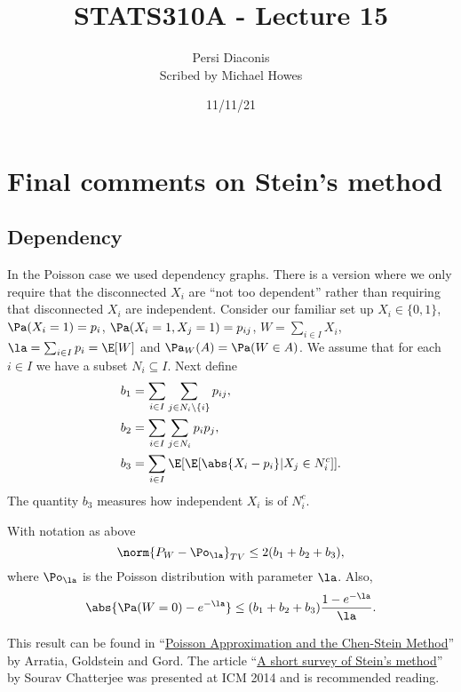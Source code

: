 



\newcommand{\s}{s}


\title{STATS310A - Lecture 15}
\author{Persi Diaconis\\ Scribed by Michael Howes}
\date{11/11/21}

\pagestyle{fancy}
\fancyhf{}


\maketitle
\tableofcontents
\section{Final comments on Stein's method}
\subsection{Dependency}
In the Poisson case we used dependency graphs. There is a version where we only require that the disconnected $X_i$ are ``not too dependent'' rather than requiring that disconnected $X_i$ are independent. Consider our familiar set up $X_i \in \{0,1\}$, $\Pa(X_i=1)=p_i$, $\Pa(X_i=1,X_j=1)=p_{ij}$, $W = \sum_{i \in I} X_i$, $\la = \sum_{i \in I}p_i = \E[W]$ and $\Pa_W(A) = \Pa(W \in A)$. We assume that for each $i \in I$ we have a subset $N_i \subseteq I$. Next define
\begin{align*}
    b_1 &= \sum_{i \in I}\sum_{j \in N_i\setminus \{i\}} p_{ij},\\
    b_2 &=\sum_{i\in I}\sum_{j \in N_i} p_ip_j,\\
    b_3 &= \sum_{i \in I} \E[\E[\abs{X_i-p_i}|X_j \in N_i^c]].
\end{align*}
The quantity $b_3$ measures how independent $X_i$ is of $N_i^c$. 
\begin{thrm}
    With notation as above
    \[\norm{P_W-\Po_\la}_{TV} \le 2(b_1+b_2+b_3),\]
    where $\Po_\la$ is the Poisson distribution with parameter $\la$. Also,
    \[\abs{\Pa(W=0)-e^{-\la}} \le (b_1+b_2+b_3)\frac{1-e^{-\la}}{\la}.\]
\end{thrm}
This result can be found in ``\href{https://projecteuclid.org/journals/statistical-science/volume-5/issue-4/Poisson-Approximation-and-the-Chen-Stein-Method/10.1214/ss/1177012015.full}{Poisson Approximation and the Chen-Stein Method}'' by Arratia, Goldstein and Gord. The article ``\href{https://arxiv.org/abs/1404.1392}{A short survey of Stein's method}'' by Sourav Chatterjee was presented at ICM 2014 and is recommended reading.
